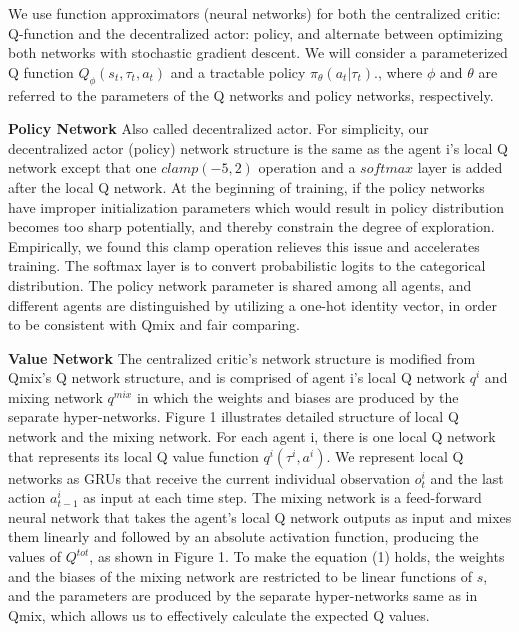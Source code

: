 \documentclass[runningheads]{llncs}
\begin{document}
We use function approximators (neural networks) for both the centralized critic: Q-function and the decentralized actor: policy, and alternate between optimizing both networks with stochastic gradient descent. We will consider a parameterized Q function $Q_{\phi}(s_t,\tau_t,a_t)$ and a tractable policy $\pi_{\theta}(a_t | \tau_t)$., where ${\phi}$ and ${\theta}$ are referred to the parameters of the Q networks and policy networks, respectively.

{\bf Policy Network} Also called decentralized actor. For simplicity,
our decentralized actor (policy) network structure is the same as the agent i's local Q network except that one $clamp (-5,2)$ operation and a $softmax$ layer is added after the local Q network. At the beginning of training, if the policy networks have improper initialization parameters which would result in policy distribution becomes too sharp potentially, and thereby constrain the degree of exploration. Empirically, we found this clamp operation relieves this issue and accelerates training. The softmax layer is to convert probabilistic logits to the categorical distribution. 
The policy network parameter is shared among all agents, and different agents are distinguished by utilizing a one-hot identity vector, in order to be consistent with Qmix and fair comparing. 


{\bf Value Network} The centralized critic's network structure is modified from Qmix's Q network structure, and is comprised of agent i's local Q network $q^{i}$ and mixing network $q^{mix}$ in which the weights and biases are produced by the separate hyper-networks. Figure 1 illustrates detailed structure of local Q network and the mixing network. 
For each agent i, there is one local Q network that represents its local Q value function $q^{i}(\tau^i, a^i)$. We represent local Q networks as GRUs \cite{b17} that receive the current individual
observation $o^i_t$ and the last action $a^i_{t-1}$ as input at each time step.
The mixing network is a feed-forward neural network that
takes the agent's local Q network outputs as input and mixes them
linearly and followed by an absolute activation function, producing the values of $Q^{tot}$, as shown in Figure 1. To make the equation (1) holds,
the weights and the biases of the mixing network are restricted
to be linear functions of $s$, and the parameters are produced by the separate
hyper-networks same as in Qmix,
which allows us to effectively calculate the expected Q values.
\end{document}
